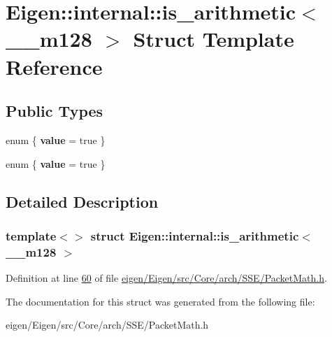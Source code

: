 \hypertarget{struct_eigen_1_1internal_1_1is__arithmetic_3_01____m128_01_4}{}\section{Eigen\+:\+:internal\+:\+:is\+\_\+arithmetic$<$ \+\_\+\+\_\+m128 $>$ Struct Template Reference}
\label{struct_eigen_1_1internal_1_1is__arithmetic_3_01____m128_01_4}
\subsection*{Public Types}
\begin{DoxyCompactItemize}
\item 
\mbox{\label{struct_eigen_1_1internal_1_1is__arithmetic_3_01____m128_01_4_a1fac5fcff79212c4d7b7f40770cf1536}} 
enum \{ {\bfseries value} = true
 \}
\item 
\mbox{\label{struct_eigen_1_1internal_1_1is__arithmetic_3_01____m128_01_4_a65e4ff36f3ae88348ab79c413264cb26}} 
enum \{ {\bfseries value} = true
 \}
\end{DoxyCompactItemize}


\subsection{Detailed Description}
\subsubsection*{template$<$$>$\newline
struct Eigen\+::internal\+::is\+\_\+arithmetic$<$ \+\_\+\+\_\+m128 $>$}



Definition at line \hyperlink{eigen_2_eigen_2src_2_core_2arch_2_s_s_e_2_packet_math_8h_source_l00060}{60} of file \hyperlink{eigen_2_eigen_2src_2_core_2arch_2_s_s_e_2_packet_math_8h_source}{eigen/\+Eigen/src/\+Core/arch/\+S\+S\+E/\+Packet\+Math.\+h}.



The documentation for this struct was generated from the following file\+:\begin{DoxyCompactItemize}
\item 
eigen/\+Eigen/src/\+Core/arch/\+S\+S\+E/\+Packet\+Math.\+h\end{DoxyCompactItemize}
